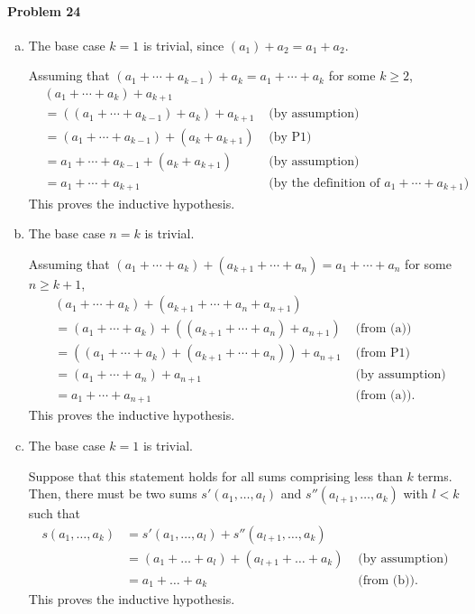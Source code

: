 \documentclass{article}
\begin{document}
\paragraph{Problem 24}
\begin{enumerate}[(a)]
  \item The base case $k = 1$ is trivial, since $(a_1) + a_2 = a_1 + a_2$.

    Assuming that $(a_1 + \cdots + a_{k-1}) + a_k = a_1 + \cdots + a_k$ for
    some $k \geq 2$,
    \begin{align*}
      &(a_1 + \cdots + a_k) + a_{k+1} \\
      &= ((a_1 + \cdots + a_{k-1}) + a_k) + a_{k+1} &\text{ (by assumption)} \\
      &= (a_1 + \cdots + a_{k-1}) + (a_k + a_{k+1}) &\text{ (by P1)} \\
      &= a_1 + \cdots + a_{k-1} + (a_k + a_{k+1}) &\text{ (by assumption)} \\
      &= a_1 + \cdots + a_{k+1} &\text{ (by the definition of } a_1 + \cdots +
      a_{k+1} \text{)}
    \end{align*}
    This proves the inductive hypothesis.
  \item The base case $n = k$ is trivial.

    Assuming that $(a_1 + \cdots + a_k) + (a_{k+1} + \cdots + a_n) = a_1 +
    \cdots + a_n$ for some $n \geq k + 1$,
    \begin{align*}
      &(a_1 + \cdots + a_k) + (a_{k+1} + \cdots + a_n + a_{n+1}) \\
      &= (a_1 + \cdots + a_k) + ((a_{k+1} + \cdots + a_n) + a_{n+1})
      &\text{ (from (a))} \\
      &= ((a_1 + \cdots + a_k) + (a_{k+1} + \cdots + a_n)) + a_{n+1}
      &\text{ (from P1)} \\
      &= (a_1 + \cdots + a_n) + a_{n+1} &\text{ (by assumption)} \\
      &= a_1 + \cdots + a_{n+1} &\text{ (from (a))}.
    \end{align*}
    This proves the inductive hypothesis.
  \item The base case $k = 1$ is trivial.

    Suppose that this statement holds for all sums comprising less than $k$
    terms. Then, there must be two sums $s'(a_1, \ldots, a_l)$ and
    $s''(a_{l+1}, \ldots, a_k)$ with $l < k$ such that
    \begin{align*}
      s(a_1, \ldots, a_k)
      &= s'(a_1, \ldots, a_l) + s''(a_{l+1}, \ldots, a_k) \\
      &= (a_1 + \ldots + a_l) + (a_{l+1} + \ldots + a_k)
      &\text{ (by assumption)} \\
      &= a_1 + \ldots + a_k &\text{ (from (b))}.
    \end{align*}
    This proves the inductive hypothesis.
\end{enumerate}
\end{document}
